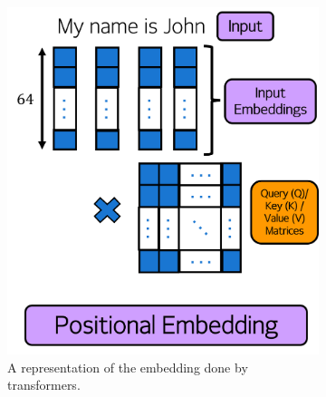 \documentclass[12pt]{article}
\begin{document}
{\begin{figure}
     \centering
     \begin{subfigure}[b]{0.3\textwidth}
         \centering
         \includegraphics[width=\textwidth]{images/inputting.png}
         \caption{A representation of the embedding done by transformers.}
         \label{fig:transformer_input}
     \end{subfigure}
     \hfill
     \begin{subfigure}[b]{0.3\textwidth}
         \centering

\end{subfigure}
\end{figure}}
\end{document}
